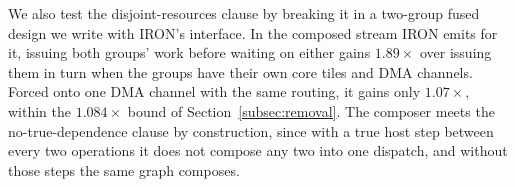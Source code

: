 We also test the disjoint-resources clause by breaking it in a two-group fused design we write with IRON's interface.
In the composed stream IRON emits for it, issuing both groups' work before waiting on either gains $1.89\times$ over issuing them in turn when the groups have their own core tiles and DMA channels.
Forced onto one DMA channel with the same routing, it gains only $1.07\times$, within the $1.084\times$ bound of Section~\ref{subsec:removal}.
The composer meets the no-true-dependence clause by construction, since with a true host step between every two operations it does not compose any two into one dispatch, and without those steps the same graph composes.


